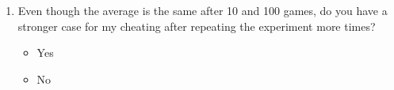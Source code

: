 \documentclass[11pt,preview]{standalone} %
\newcommand{\E}{\mathbb{E}}
\newcommand{\Var}{\text{Var}}
\begin{document}
\begin{enumerate}
\begin{enumerate}
\begin{enumerate}
Define a new random variable corresponding to your average earnings, $Z =\sum_{i=1}^{100} \frac{1}{100} Z_i$, where $Z_i$ is your earnings on the $i$th round. Repeat the process above (calculate $\Var[Z]$, then use Chebyshev's Inequality) to give the best upper bound you can on the probability that $Z = \$1.40$. Give your answer as a decimal, rounding to the nearest hundredth.
\begin{Freeform}{0.01}
$\Pr[Z = \$1.40] \le  \Pr[|Z - \E[Z]| \ge a] \le$  
\Hint Review the definition of expectation and linearity of expectation.
\end{Freeform}
\item Even though the average is the same after 10 and 100 games, do you have a stronger case for my cheating after repeating the experiment more times?
\begin{Choices}
\begin{itemize}
\TrueChoice \item Yes
\FalseChoice \item No
\end{itemize}
\end{Choices}
\end{enumerate}


\end{enumerate}
\end{enumerate}
\end{document}
